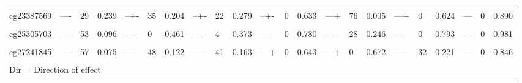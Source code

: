 \documentclass[11pt,oneside]{bristolthesis}
\begin{document}
\begin{landscape}
\begin{table}[!h]
{\begin{tabular}[t]{llllllllllllllllllllll}
\addlinespace
\cellcolor{gray!6}{cg21566642} & \cellcolor{gray!6}{----} & \cellcolor{gray!6}{46} & \cellcolor{gray!6}{0.136} & \cellcolor{gray!6}{----} & \cellcolor{gray!6}{38} & \cellcolor{gray!6}{0.184} & \cellcolor{gray!6}{----} & \cellcolor{gray!6}{18} & \cellcolor{gray!6}{0.300} & \cellcolor{gray!6}{+-++} & \cellcolor{gray!6}{0} & \cellcolor{gray!6}{0.681} & \cellcolor{gray!6}{----} & \cellcolor{gray!6}{0} & \cellcolor{gray!6}{0.798} & \cellcolor{gray!6}{----} & \cellcolor{gray!6}{65} & \cellcolor{gray!6}{0.035} & \cellcolor{gray!6}{---} & \cellcolor{gray!6}{69} & \cellcolor{gray!6}{0.040}\\
cg23387569 & ---- & 29 & 0.239 & --+- & 35 & 0.204 & --+- & 22 & 0.279 & --+- & 0 & 0.633 & ---+ & 76 & 0.005 & ---+ & 0 & 0.624 & --- & 0 & 0.890\\
\cellcolor{gray!6}{cg23771366} & \cellcolor{gray!6}{----} & \cellcolor{gray!6}{42} & \cellcolor{gray!6}{0.161} & \cellcolor{gray!6}{----} & \cellcolor{gray!6}{75} & \cellcolor{gray!6}{0.007} & \cellcolor{gray!6}{----} & \cellcolor{gray!6}{72} & \cellcolor{gray!6}{0.013} & \cellcolor{gray!6}{++++} & \cellcolor{gray!6}{0} & \cellcolor{gray!6}{0.805} & \cellcolor{gray!6}{----} & \cellcolor{gray!6}{0} & \cellcolor{gray!6}{0.518} & \cellcolor{gray!6}{---+} & \cellcolor{gray!6}{27} & \cellcolor{gray!6}{0.249} & \cellcolor{gray!6}{+--} & \cellcolor{gray!6}{81} & \cellcolor{gray!6}{0.006}\\
cg25305703 & ---- & 53 & 0.096 & ---- & 0 & 0.461 & ---- & 4 & 0.373 & ---- & 0 & 0.780 & ---- & 28 & 0.246 & ---- & 0 & 0.793 & --- & 0 & 0.981\\
\cellcolor{gray!6}{cg26963277} & \cellcolor{gray!6}{----} & \cellcolor{gray!6}{0} & \cellcolor{gray!6}{0.512} & \cellcolor{gray!6}{----} & \cellcolor{gray!6}{0} & \cellcolor{gray!6}{0.516} & \cellcolor{gray!6}{----} & \cellcolor{gray!6}{0} & \cellcolor{gray!6}{0.430} & \cellcolor{gray!6}{--++} & \cellcolor{gray!6}{53} & \cellcolor{gray!6}{0.095} & \cellcolor{gray!6}{---+} & \cellcolor{gray!6}{0} & \cellcolor{gray!6}{0.466} & \cellcolor{gray!6}{----} & \cellcolor{gray!6}{17} & \cellcolor{gray!6}{0.308} & \cellcolor{gray!6}{---} & \cellcolor{gray!6}{10} & \cellcolor{gray!6}{0.329}\\
\addlinespace
cg27241845 & ---- & 57 & 0.075 & ---- & 48 & 0.122 & ---- & 41 & 0.163 & ---+ & 0 & 0.643 & ---+ & 0 & 0.672 & ---- & 32 & 0.221 & --- & 0 & 0.846\\
\bottomrule
\multicolumn{22}{l}{\textsuperscript{} Dir = Direction of effect}\\

\end{tabular}}
\end{table}
\end{landscape}
\end{document}
